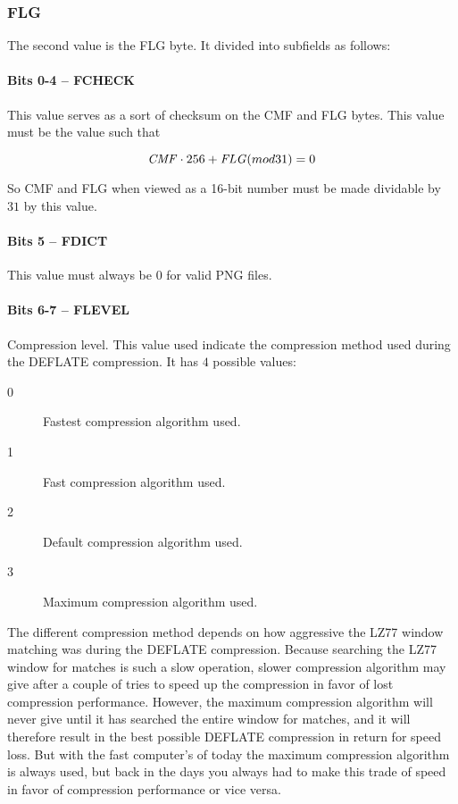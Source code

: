 \subsubsection{FLG}

The second value is the FLG byte. It divided into subfields as
follows:

\paragraph{Bits 0-4 -- FCHECK}

This value serves as a sort of checksum on the CMF and FLG bytes. This
value must be the value such that

\begin{equation*}
 \mathit{CMF} \cdot 256 + \mathit{FLG} (mod 31) = 0
\end{equation*}

So CMF and FLG when viewed as a 16-bit number must be made dividable
by $31$ by this value. 

\paragraph{Bits 5 -- FDICT}

This value must always be $0$ for valid PNG files.

\paragraph{Bits 6-7 -- FLEVEL}

Compression level. This value used indicate the compression method used
during the DEFLATE compression. It has $4$ possible values:

\begin{description}
\item[0] Fastest compression algorithm used.
\item[1] Fast compression algorithm used.
\item[2] Default compression algorithm used.
\item[3] Maximum compression algorithm used.
\end{description}

The different compression method depends on how aggressive the LZ77
window matching was during the DEFLATE compression. Because searching
the LZ77 window for matches is such a slow operation, slower
compression algorithm may give after a couple of tries to speed up the
compression in favor of lost compression performance. However, the
maximum compression algorithm will never give until it has searched
the entire window for matches, and it will therefore result in the
best possible DEFLATE compression in return for speed loss. But with
the fast computer's of today the maximum compression algorithm is
always used, but back in the days you always had to make this trade
of speed in favor of compression performance or vice versa.

